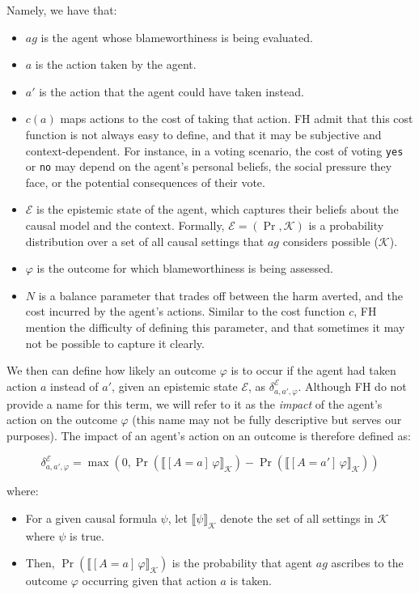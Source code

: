 \documentclass{article}
\begin{document}
Namely, we have that:

\begin{itemize}
  \item $ag$ is the agent whose blameworthiness is being evaluated.
  \item $a$ is the action taken by the agent.
  \item $a'$ is the action that the agent could have taken instead.
  \item $c(a)$ maps actions to the cost of taking that action. FH admit that this cost function is not always easy to define, and that it may be subjective and context-dependent. For instance, in a voting scenario, the cost of voting \texttt{yes} or \texttt{no} may depend on the agent's personal beliefs, the social pressure they face, or the potential consequences of their vote.
  \item $\mathcal{E}$ is the epistemic state of the agent, which captures their beliefs about the causal model and the context. Formally, $\mathcal{E} = (\Pr, \mathcal{K})$ is a probability distribution over a set of all causal settings that $ag$ considers possible ($\mathcal{K}$).
  \item $\varphi$ is the outcome for which blameworthiness is being assessed.
  \item $N$ is a balance parameter that trades off between the harm averted, and the cost incurred by the agent's actions. Similar to the cost function $c$, FH mention the difficulty of defining this parameter, and that sometimes it may not be possible to capture it clearly.
\end{itemize}

We then can define how likely an outcome $\varphi$ is to occur if the agent had taken action $a$ instead of $a'$, given an epistemic state $\mathcal{E}$, as $\delta^\mathcal{E}_{a,a',\varphi}$. Although FH do not provide a name for this term, we will refer to it as the \textit{impact} of the agent's action on the outcome $\varphi$ (this name may not be fully descriptive but serves our purposes). The impact of an agent's action on an outcome is therefore defined as:

\begin{equation}
  \delta^\mathcal{E}_{a,a',\varphi} = 
  \max(0, \Pr(\llbracket [ A = a ]\,\varphi \rrbracket_\mathcal{K}) - \Pr(\llbracket [ A = a' ]\,\varphi \rrbracket_\mathcal{K}))
\label{eq:impact}
\end{equation}

where:

\begin{itemize}
  \item For a given causal formula $\psi$, let $\llbracket \psi \rrbracket_\mathcal{K}$ denote the set of all settings in $\mathcal{K}$ where $\psi$ is true. 
  \item Then, $\Pr(\llbracket [ A = a ]\,\varphi \rrbracket_\mathcal{K})$ is the probability that agent $ag$ ascribes to the outcome $\varphi$ occurring given that action $a$ is taken.
\end{itemize}
\end{document}
